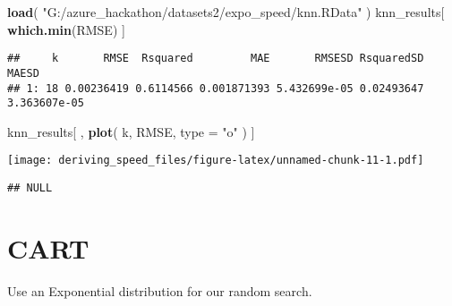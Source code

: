 \documentclass[]{article}
\newenvironment{Shaded}{\begin{snugshade}}{\end{snugshade}}
\newcommand{\DataTypeTok}[1]{\textcolor[rgb]{0.13,0.29,0.53}{#1}}
\newcommand{\DecValTok}[1]{\textcolor[rgb]{0.00,0.00,0.81}{#1}}
\newcommand{\FloatTok}[1]{\textcolor[rgb]{0.00,0.00,0.81}{#1}}
\newcommand{\KeywordTok}[1]{\textcolor[rgb]{0.13,0.29,0.53}{\textbf{#1}}}
\newcommand{\NormalTok}[1]{#1}
\newcommand{\OperatorTok}[1]{\textcolor[rgb]{0.81,0.36,0.00}{\textbf{#1}}}
\newcommand{\StringTok}[1]{\textcolor[rgb]{0.31,0.60,0.02}{#1}}
\begin{document}
\begin{Shaded}
\begin{Highlighting}[]
\KeywordTok{load}\NormalTok{( }\StringTok{"G:/azure_hackathon/datasets2/expo_speed/knn.RData"}\NormalTok{ )}
\NormalTok{knn_results[ }\KeywordTok{which.min}\NormalTok{(RMSE) ]}
\end{Highlighting}
\end{Shaded}

\begin{verbatim}
##     k       RMSE  Rsquared         MAE       RMSESD RsquaredSD        MAESD
## 1: 18 0.00236419 0.6114566 0.001871393 5.432699e-05 0.02493647 3.363607e-05
\end{verbatim}

\begin{Shaded}
\begin{Highlighting}[]
\NormalTok{knn_results[ , }\KeywordTok{plot}\NormalTok{( k, RMSE, }\DataTypeTok{type =} \StringTok{"o"}\NormalTok{ ) ]}
\end{Highlighting}
\end{Shaded}

\texttt{[image: deriving\_speed\_files/figure-latex/unnamed-chunk-11-1.pdf]}

\begin{verbatim}
## NULL
\end{verbatim}

\hypertarget{cart}{%
\section{CART}\label{cart}}

Use an Exponential distribution for our random search.

\begin{Shaded}
\end{Shaded}
\end{document}

